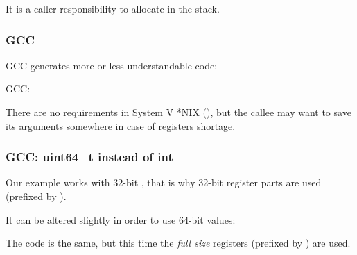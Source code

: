 It is a \gls{caller} responsibility to allocate  in the stack.

\subsubsection{GCC}

\Optimizing GCC generates more or less understandable code:



\NonOptimizing GCC:




There are no  requirements in System V *NIX (\SysVABI), but the \gls{callee} may want to save
its arguments somewhere in case of registers shortage.

\subsubsection{GCC: uint64\_t instead of int}


Our example works with 32-bit \Tint, that is why 32-bit register parts are used (prefixed by ).

It can be altered slightly in order to use 64-bit values:





The code is the same, but this time the \emph{full size} registers (prefixed by ) are used.

